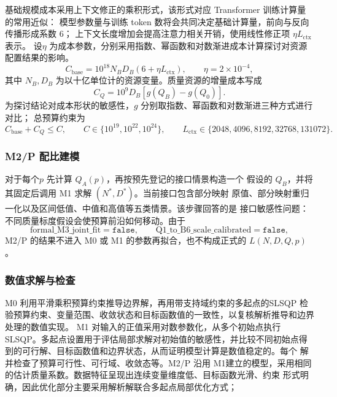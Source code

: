 基础规模成本采用上下文修正的乘积形式，该形式对应 Transformer 训练计算量的常用近似：
模型参数量与训练 token 数将会共同决定基础计算量，前向与反向传播形成系数 $6$；
上下文长度增加会提高注意力相关开销，使用线性修正项 $\eta L_{\mathrm{ctx}}$ 表示。
设$\eta$ 为成本参数，分别采用指数、幂函数和对数渐进成本计算探讨对资源配置结果的影响。
\begin{equation}
  C_{\mathrm{base}}
  =10^{18}N_BD_B\left(6+\eta L_{\mathrm{ctx}}\right),
  \qquad \eta=2\times10^{-4},
  \label{eq:q3-base-cost}
\end{equation}
其中 $N_B,D_B$ 为以十亿单位计的资源变量。质量资源的增量成本写成
\begin{equation}
  C_Q=10^9D_B\left[g(Q_B)-g(Q_0)\right].
  \label{eq:q3-quality-cost}
\end{equation}
为探讨结论对成本形状的敏感性，$g$ 分别取指数、幂函数和对数渐进三种方式进行对比；
总预算约束为
\begin{equation}
  C_{\mathrm{base}}+C_Q\leq C,
  \qquad C\in\{10^{19},10^{22},10^{24}\},
  \qquad L_{\mathrm{ctx}}\in
  \{2048,4096,8192,32768,131072\}.
  \label{eq:q3-constraints}
\end{equation}

\subsubsection{M2/P 配比建模}

对于每个$p$ 先计算 $Q_A(p)$，再按预先登记的接口情景构造一个
假设的 $Q_B$，并将其固定后调用 M1 求解 $(N^*,D^*)$。当前接口包含部分映射
原值、部分映射重归一化以及区间低值、中值和高值等五类情景。该步骤回答的是
接口敏感性问题：不同质量标度假设会使预算前沿如何移动。由于
\begin{equation*}
  \text{formal\_M3\_joint\_fit}=\texttt{false},\qquad
  \text{Q1\_to\_B6\_scale\_calibrated}=\texttt{false},
\end{equation*}
M2/P 的结果不进入 M0 或 M1 的参数再拟合，也不构成正式的
$L(N,D,Q,p)$。

\subsubsection{数值求解与检查}

M0 利用平滑乘积预算约束推导边界解，再用带支持域约束的多起点的SLSQP 检验预算约束、变量范围、收敛状态和目标函数值的一致性，以复核解析推导和边界处理的数值实现。
M1 对输入的正值采用对数参数化，从多个初始点执行 SLSQP。多起点设置用于评估局部求解对初始值的敏感性，并比较不同初始点得到的可行解、目标函数值和边界状态，从而证明模型计算是数值稳定的。每个
解并检查了预算可行性、可行域、收敛态等。M2/P 沿用 M1建立的模型，采用相同的估计质量系数。数据特征呈现出连续变量维度低、目标函数光滑、约束
形式明确，因此优化部分主要采用解析解联合多起点局部优化方式；

